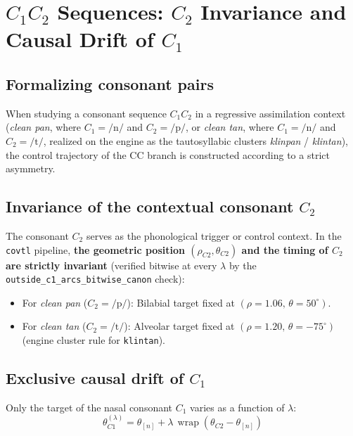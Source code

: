 \documentclass[11pt,a4paper]{article}
\begin{document}
\section{$C_1 C_2$ Sequences: $C_2$ Invariance and Causal Drift of $C_1$}

\subsection{Formalizing consonant pairs}
When studying a consonant sequence $C_1 C_2$ in a regressive assimilation context (\textit{clean pan}, where $C_1 = \text{/n/}$ and $C_2 = \text{/p/}$, or \textit{clean tan}, where $C_1 = \text{/n/}$ and $C_2 = \text{/t/}$, realized on the engine as the tautosyllabic clusters \textit{klinpan} / \textit{klintan}), the control trajectory of the CC branch is constructed according to a strict asymmetry.

\subsection{Invariance of the contextual consonant $C_2$}
The consonant $C_2$ serves as the phonological trigger or control context. In the \texttt{covtl} pipeline, \textbf{the geometric position $(\rho_{C2}, \theta_{C2})$ and the timing of $C_2$ are strictly invariant} (verified bitwise at every $\lambda$ by the \texttt{outside\_c1\_arcs\_bitwise\_canon} check):
\begin{itemize}[leftmargin=*]
    \item For \textit{clean pan} ($C_2 = \text{/p/}$): Bilabial target fixed at $(\rho = 1.06,\, \theta = 50^\circ)$.
    \item For \textit{clean tan} ($C_2 = \text{/t/}$): Alveolar target fixed at $(\rho = 1.20,\, \theta = -75^\circ)$ (engine cluster rule for \texttt{klintan}).
\end{itemize}

\subsection{Exclusive causal drift of $C_1$}
Only the target of the nasal consonant $C_1$ varies as a function of $\lambda$:
\begin{equation}
\theta_{C1}^{(\lambda)} = \theta_{[n]} + \lambda \,\operatorname{wrap}\!\left(\theta_{C2} - \theta_{[n]}\right)
\end{equation}
\end{document}
